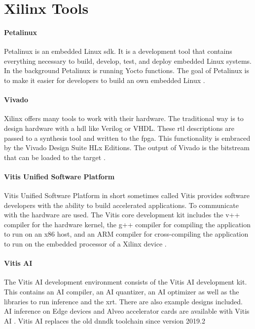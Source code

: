 \section{Xilinx Tools}
\label{sec:embedded_platform:xilinx_tools}

\paragraph{Petalinux}
Petalinux is an embedded Linux \acrfull{sdk}.
It is a development tool that contains everything necessary to build, develop, test, and deploy embedded Linux systems.
In the background Petalinux is running Yocto functions.
The goal of Petalinux is to make it easier for developers to build an own embedded Linux \cite{petalinux_user_guide}.

\paragraph{Vivado}
Xilinx offers many tools to work with their hardware.
The traditional way is to design hardware with a \acrfull{hdl} like Verilog or VHDL.
These \acrfull{rtl} descriptions are passed to a synthesis tool and written to the \acrshort{fpga}.
This functionality is embraced by the Vivado Design Suite HLx Editions.
The output of Vivado is the bitstream that can be loaded to the target \cite{vivado_user_guide}.

\paragraph{Vitis Unified Software Platform}
Vitis Unified Software Platform in short sometimes called Vitis provides software developers with the ability to build accelerated applications.
To communicate with the hardware  are used.
The Vitis core development kit includes the v++ compiler for the hardware kernel, the g++ compiler for compiling the application to run on an x86 host, and an ARM compiler for cross-compiling the application to run on the embedded processor of a Xilinx device \cite{vitis_user_guide}.

\paragraph{Vitis AI}
The Vitis AI development environment consists of the Vitis AI development kit.
This contains an AI compiler, an AI quantizer, an AI optimizer as well as the libraries to run inference and the \acrfull{xrt}.
There are also example designs included.
AI inference on Edge devices and Alveo accelerator cards are available with Vitis AI \cite{vitis_ai_user_guide}.
Vitis AI replaces the old \acrshort{dnndk} toolchain since version 2019.2 

